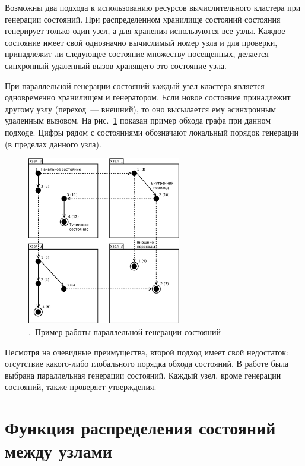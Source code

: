 \documentclass[12pt,a4paper,article]{bpm2}
\begin{document}
Возможны два подхода к использованию ресурсов вычислительного кластера при генерации состояний.
При распределенном хранилище состояний состояния генерирует только один узел, а для хранения используются все узлы.
Каждое состояние имеет свой однозначно вычислимый номер узла и для проверки, принадлежит ли следующее состояние множеству посещенных, делается синхронный удаленный вызов хранящего это состояние узла.

При параллельной генерации состояний каждый узел кластера является одновременно хранилищем и генератором.
Если новое состояние принадлежит другому узлу (переход~--- внешний), то оно высылается ему асинхронным удаленным вызовом. На рис.~\ref{fig:distr-generation} показан пример обхода графа при данном подходе.
Цифры рядом с состояниями обозначают локальный порядок генерации (в пределах данного узла).

\begin{figure}[ht]
  \centering
  \includegraphics[width=0.6\textwidth]{graphics/distr-generation-2.pdf}
  \caption{.~Пример работы параллельной генерации состояний}
  \label{fig:distr-generation}
\end{figure}

Несмотря на очевидные преимущества, второй подход имеет свой недостаток: отсутствие какого-либо глобального порядка обхода состояний. В работе была выбрана параллельная генерации состояний. Каждый узел, кроме генерации состояний, также проверяет утверждения.

\section{Функция распределения состояний между узлами}
\label{sec:state-partition}
\end{document}

